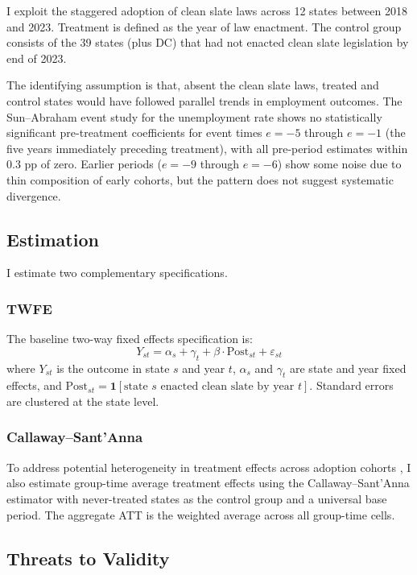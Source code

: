 \documentclass[12pt]{article}
\begin{document}
I exploit the staggered adoption of clean slate laws across 12 states between 2018 and 2023. Treatment is defined as the year of law enactment. The control group consists of the 39 states (plus DC) that had not enacted clean slate legislation by end of 2023.

The identifying assumption is that, absent the clean slate laws, treated and control states would have followed parallel trends in employment outcomes. The Sun--Abraham event study for the unemployment rate shows no statistically significant pre-treatment coefficients for event times $e = -5$ through $e = -1$ (the five years immediately preceding treatment), with all pre-period estimates within 0.3 pp of zero. Earlier periods ($e = -9$ through $e = -6$) show some noise due to thin composition of early cohorts, but the pattern does not suggest systematic divergence.

\subsection{Estimation}

I estimate two complementary specifications.

\subsubsection*{TWFE} The baseline two-way fixed effects specification is:
\begin{equation}
Y_{st} = \alpha_s + \gamma_t + \beta \cdot \text{Post}_{st} + \varepsilon_{st}
\end{equation}
where $Y_{st}$ is the outcome in state $s$ and year $t$, $\alpha_s$ and $\gamma_t$ are state and year fixed effects, and $\text{Post}_{st} = \mathbf{1}[\text{state } s \text{ enacted clean slate by year } t]$. Standard errors are clustered at the state level.

\subsubsection*{Callaway--Sant'Anna} To address potential heterogeneity in treatment effects across adoption cohorts \citep{callaway2021}, I also estimate group-time average treatment effects using the Callaway--Sant'Anna estimator with never-treated states as the control group and a universal base period. The aggregate ATT is the weighted average across all group-time cells.

\subsection{Threats to Validity}
\end{document}
